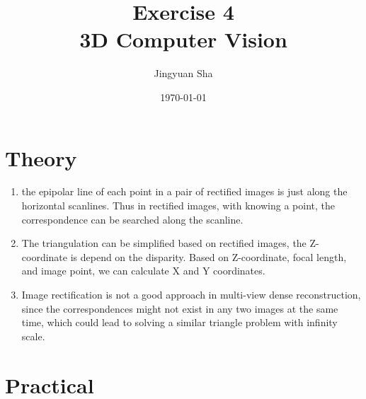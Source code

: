 \documentclass[a4paper, twoside, english]{article}
\title{Exercise 4 \\ 3D Computer Vision}  %
\author{Jingyuan Sha}                       %
\date{\today}                              %
\begin{document}
\maketitle


\section{Theory}
\begin{enumerate}
	\item the epipolar line of each point in a pair of rectified images is just along the horizontal scanlines. Thus in rectified images, with knowing a point, the correspondence can be searched along the scanline.
	\item The triangulation can be simplified based on rectified images, the Z-coordinate is depend on the disparity. Based on Z-coordinate, focal length, and image point, we can calculate X and Y coordinates.
	\item Image rectification is not a good approach in multi-view dense reconstruction, since the correspondences might not exist in any two images at the same time, which could lead to solving a similar triangle problem with infinity scale. 
\end{enumerate}



\section{Practical}
\end{document}

